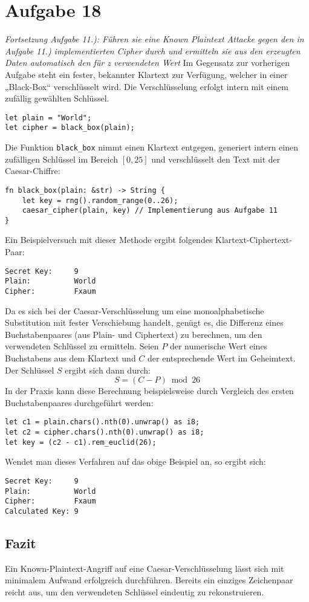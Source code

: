 \section{Aufgabe 18}

\textit{Fortsetzung Aufgabe 11.): Führen sie eine Known Plaintext Attacke gegen den in
Aufgabe 11.) implementierten Cipher durch und ermitteln sie aus den erzeugten
Daten automatisch den für z verwendeten Wert}
\vspace*{1em}\newline
Im Gegensatz zur vorherigen Aufgabe steht ein fester, bekannter Klartext zur Verfügung, welcher in einer „Black-Box“ verschlüsselt wird. Die Verschlüsselung erfolgt intern mit einem zufällig gewählten Schlüssel.
\begin{verbatim}
let plain = "World";
let cipher = black_box(plain);
\end{verbatim}
Die Funktion \texttt{black\_box} nimmt einen Klartext entgegen, generiert intern einen zufälligen Schlüssel im Bereich $[0, 25]$ und verschlüsselt den Text mit der Caesar-Chiffre:
\begin{verbatim}
fn black_box(plain: &str) -> String {
    let key = rng().random_range(0..26);
    caesar_cipher(plain, key) // Implementierung aus Aufgabe 11
}
\end{verbatim}
Ein Beispielversuch mit dieser Methode ergibt folgendes Klartext-Ciphertext-Paar:
\begin{verbatim}
Secret Key:     9
Plain:          World
Cipher:         Fxaum
\end{verbatim}
Da es sich bei der Caesar-Verschlüsselung um eine monoalphabetische Substitution mit fester Verschiebung handelt, genügt es, die Differenz eines Buchstabenpaares (aus Plain- und Ciphertext) zu berechnen, um den verwendeten Schlüssel zu ermitteln.
Seien $P$ der numerische Wert eines Buchstabens aus dem Klartext und $C$ der entsprechende Wert im Geheimtext. Der Schlüssel $S$ ergibt sich dann durch:
\[
S = (C - P) \bmod 26
\]
In der Praxis kann diese Berechnung beispielsweise durch Vergleich des ersten Buchstabenpaares durchgeführt werden:
\begin{verbatim}
let c1 = plain.chars().nth(0).unwrap() as i8;
let c2 = cipher.chars().nth(0).unwrap() as i8;
let key = (c2 - c1).rem_euclid(26);
\end{verbatim}
Wendet man dieses Verfahren auf das obige Beispiel an, so ergibt sich:
\begin{verbatim}
Secret Key:     9
Plain:          World
Cipher:         Fxaum
Calculated Key: 9
\end{verbatim}

\subsection*{Fazit}
Ein Known-Plaintext-Angriff auf eine Caesar-Verschlüsselung lässt sich mit minimalem Aufwand erfolgreich durchführen. 
Bereits ein einziges Zeichenpaar reicht aus, um den verwendeten Schlüssel eindeutig zu rekonstruieren.